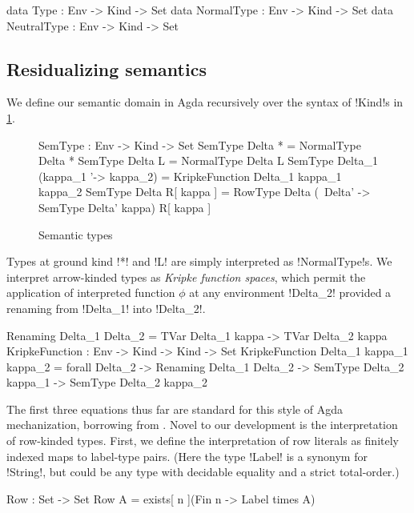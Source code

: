 \documentclass[sigplan,10pt,review]{acmart}\settopmatter{printfolios=true,printccs=false,printacmref=false}
\begin{document}
\begin{agda}
data Type : Env -> Kind -> Set
data NormalType : Env -> Kind -> Set
data NeutralType : Env -> Kind -> Set 
\end{agda}

\subsection{Residualizing semantics}

We define our semantic domain in Agda recursively over the syntax of !Kind!s in \cref{fig:SemType}.

\begin{figure}
\begin{agda}
SemType : Env -> Kind -> Set
SemType Delta * = NormalType Delta *
SemType Delta L = NormalType Delta L 
SemType Delta_1 (kappa_1 '-> kappa_2) = KripkeFunction Delta_1  kappa_1  kappa_2 
SemType Delta R[ kappa ] = 
  RowType Delta (\ Delta' -> SemType Delta' kappa) R[ kappa ]
\end{agda}
\caption{Semantic types}
\label{fig:SemType}
\end{figure}

Types at ground kind !*! and !L! are simply interpreted as !NormalType!s. We interpret arrow-kinded types as \emph{Kripke function spaces}, which permit the application of interpreted function $\phi$ at any environment !Delta_2! provided a renaming from !Delta_1! into !Delta_2!. %

\begin{agda}
Renaming Delta_1  Delta_2 = TVar Delta_1 kappa -> TVar Delta_2 kappa
KripkeFunction : Env -> Kind -> Kind -> Set
KripkeFunction Delta_1  kappa_1  kappa_2 =  forall {Delta_2} -> 
  Renaming Delta_1  Delta_2 -> SemType Delta_2  kappa_1 -> SemType Delta_2  kappa_2
\end{agda}

The first three equations thus far are standard for this style of Agda mechanization, borrowing from \citet{ChapmanKNW19}. Novel to our development is the interpretation of row-kinded types. First, we define the interpretation of row literals as finitely indexed maps to label-type pairs. (Here the type !Label! is a synonym for !String!, but could be any type with decidable equality and a strict total-order.)

\begin{agda} 
Row : Set -> Set
Row A = exists[ n ](Fin n -> Label times A)
\end{agda}
\end{document}
